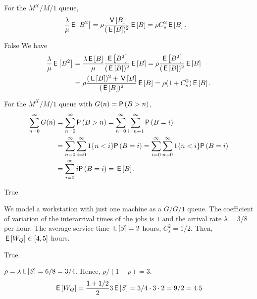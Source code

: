 \begin{exercise}[201704]%
For the $M^X/M/1$ queue, 
\begin{equation*}
  \begin{split}
  \frac{\lambda}\mu \,\mathsf{E}\left[B^2\right] 
&= \rho \frac{\,\mathsf{V}\left[B\right]}{(\,\mathsf{E}\left[B\right])^2}\,\mathsf{E}\left[B\right] = \rho C_s^2\,\mathsf{E}\left[B\right].
  \end{split}
\end{equation*}
\begin{solution} False
We have
\begin{equation*}
  \begin{split}
  \frac{\lambda}\mu \,\mathsf{E}\left[B^2\right] 
&=   \frac{\lambda\,\mathsf{E}\left[B\right]}{\mu} \frac{\,\mathsf{E}\left[B^2\right]}{(\,\mathsf{E}\left[B\right])^2} \,\mathsf{E}\left[B\right]  = \rho \frac{\,\mathsf{E}\left[B^2\right]}{(\,\mathsf{E}\left[B\right])^2} \,\mathsf{E}\left[B\right] \\
&= \rho \frac{(\,\mathsf{E}\left[B\right])^2+\,\mathsf{V}\left[B\right]}{(\,\mathsf{E}\left[B\right])^2}\,\mathsf{E}\left[B\right] = \rho (1+C_s^2)\,\mathsf{E}\left[B\right].
  \end{split}
\end{equation*}
\end{solution}
\end{exercise}

\begin{exercise}[201704]%
  For the $M^X/M/1$ queue with $G(n) = \P{B> n}$, 
\begin{align*}
\sum_{n=0}^\infty G(n) 
&= \sum_{n=0}^\infty \P{B>n} 
= \sum_{n=0}^\infty \sum_{i=n+1}^\infty \P{B=i}  \\
& = \sum_{n=0}^\infty \sum_{i=0}^\infty 1\{n<i\} \P{B=i} 
= \sum_{i=0}^\infty \sum_{n=0}^\infty 1 \{n<i\} \P{B=i} \\
&= \sum_{i=0}^\infty i \P{B=i} = \E B.
\end{align*}
\begin{solution} True
\end{solution}
\end{exercise}

\begin{exercise}[201704]%
  We model a workstation with just one machine as a $G/G/1$ queue. The coefficient of variation of the interarrival times of the jobs is $1$ and the arrival rate $\lambda=3/8$ per hour. The
  average service time $\,\mathsf{E}\left[S\right] = 2$ hours, $C^2_s = 1/2$.  Then, $\,\mathsf{E}\left[W_Q\right] \in [4, 5]$ hours. 
\begin{solution} True.

$\rho=\lambda \,\mathsf{E}\left[S\right] = 6/8 = 3/4$. Hence, $\rho/(1-\rho)=3$.
  \begin{equation*}
    \,\mathsf{E}\left[W_Q\right]= \frac{1+1/2}2 3 \,\mathsf{E}\left[S\right] = 3/4 \cdot 3 \cdot 2 = 9/2 = 4.5
  \end{equation*}
\end{solution}

\end{exercise}




